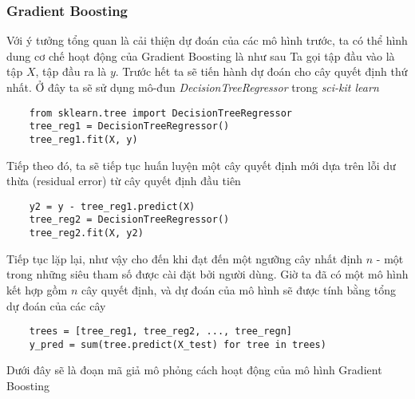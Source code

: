 \subsubsection*{Gradient Boosting}
Với ý tưởng tổng quan là cải thiện dự đoán của các mô hình trước, ta có thể hình dung cơ chế hoạt động của Gradient Boosting là như sau
Ta gọi tập đầu vào là tập $X$, tập đầu ra là $y$. Trước hết ta sẽ tiến hành dự đoán cho cây quyết định thứ nhất. Ở đây ta sẽ sử dụng mô-đun \textit{DecisionTreeRegressor} trong \textit{sci-kit learn}
\begin{verbatim}
    from sklearn.tree import DecisionTreeRegressor
    tree_reg1 = DecisionTreeRegressor()
    tree_reg1.fit(X, y)
\end{verbatim}
Tiếp theo đó, ta sẽ tiếp tục huấn luyện một cây quyết định mới dựa trên lỗi dư thừa (residual error) từ cây quyết định đầu tiên
\begin{verbatim}
    y2 = y - tree_reg1.predict(X)
    tree_reg2 = DecisionTreeRegressor()
    tree_reg2.fit(X, y2)
\end{verbatim}
Tiếp tục lặp lại, như vậy cho đến khi đạt đến một ngưỡng cây nhất định $n$ - một trong những siêu tham số được cài đặt bởi người dùng. Giờ ta đã có một mô hình kết hợp gồm $n$ cây quyết định, và dự đoán của mô hình sẽ được tính bằng tổng dự đoán của các cây
\begin{verbatim}
    trees = [tree_reg1, tree_reg2, ..., tree_regn]
    y_pred = sum(tree.predict(X_test) for tree in trees)
\end{verbatim}
Dưới đây sẽ là đoạn mã giả mô phỏng cách hoạt động của mô hình Gradient Boosting\\

